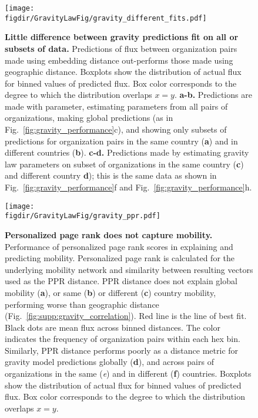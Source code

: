 \documentclass[12pt]{article} %
\def\figdir{../Figs}
\begin{document}
%
%
\begin{figure}[p!]
    \centering
    \label{fig:supp:gravity_prediction_subsets}
    \texttt{[image: \\figdir/GravityLawFig/gravity\_different\_fits.pdf]}
    \caption{
        \textbf{Little difference between gravity predictions fit on all or subsets of data.}
        Predictions of flux between organization pairs made using embedding distance out-performs those made using geographic distance. 
        Boxplots show the distribution of actual flux for binned values of predicted flux.
        Box color corresponds to the degree to which the distribution overlaps $x = y$.
        \textbf{a-b.} Predictions are made with parameter, estimating parameters from all pairs of organizations, making global predictions (as in Fig.~\ref{fig:gravity_performance}c), and showing only subsets of predictions for organization pairs in the same country (\textbf{a}) and in different countries (\textbf{b}).
        \textbf{c-d.} Predictions made by estimating gravity law parameters on subset of organizations in the same country (\textbf{c}) and different country \textbf{d}); 
        this is the same data as shown in Fig.~\ref{fig:gravity_performance}f and Fig.~\ref{fig:gravity_performance}h. 
    }
\end{figure}



%
%
\begin{figure}[p!]
    \centering
    \label{fig:supp:gravity_ppr}
    \texttt{[image: \\figdir/GravityLawFig/gravity\_ppr.pdf]}
    \caption{
        \textbf{Personalized page rank does not capture mobility.}
        Performance of personalized page rank scores in explaining and predicting mobility.
        Personalized page rank is calculated for the underlying mobility network and similarity between resulting vectors used as the PPR distance.
        PPR distance does not explain global mobility (\textbf{a}), or same (\textbf{b}) or different (\textbf{c}) country mobility, performing worse than geographic distance (Fig.~\ref{fig:supp:gravity_correlation}). 
        Red line is the line of best fit. 
        Black dots are mean flux across binned distances.
        The color indicates the frequency of organization pairs within each hex bin.
        Similarly, PPR distance performs poorly as a distance metric for gravity model predictions globally (\textbf{d}), and across pairs of organizations in the same (\textit{e}) and in different (\textbf{f}) countries. 
        Boxplots show the distribution of actual flux for binned values of predicted flux.
        Box color corresponds to the degree to which the distribution overlaps $x = y$.
    }
\end{figure}
\end{document}
